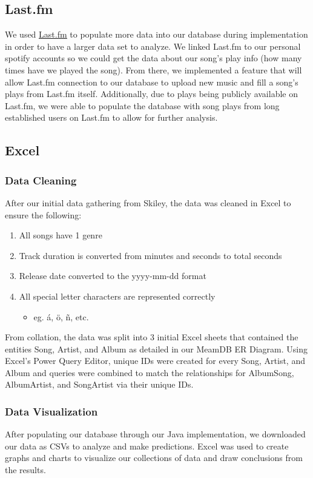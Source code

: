 \documentclass[12pt]{article}
\begin{document}
    \subsection{Last.fm}
    We used \underline{\href{https://www.last.fm/}{Last.fm}} to populate more data into our database during implementation
    in order to have a larger data set to analyze. We linked Last.fm to our
    personal spotify accounts so we could get the data about our song's play info
    (how many times have we played the song). From there, we implemented a feature
    that will allow Last.fm connection to our database to upload new music and fill
    a song's plays from Last.fm itself. Additionally, due to plays being publicly
    available on Last.fm, we were able to populate the database with song plays from
    long established users on Last.fm to allow for further analysis.

    \subsection{Excel}
    \subsubsection{Data Cleaning}
    After our initial data gathering from Skiley, the data was cleaned in Excel to ensure
    the following:
    \begin{enumerate}
        \item All songs have 1 genre
        \item Track duration is converted from minutes and seconds to total seconds
        \item Release date converted to the yyyy-mm-dd format
        \item All special letter characters are represented correctly
            \begin{itemize}
                \item eg. \'{a}, \"{o}, \~{n}, etc.
            \end{itemize}
    \end{enumerate}
    From collation, the data was split into 3 initial Excel sheets that contained the entities Song,
    Artist, and Album as detailed in our MeamDB ER Diagram. Using Excel's Power Query Editor, unique
    IDs were created for every Song, Artist, and Album and queries were combined to match the relationships
    for AlbumSong, AlbumArtist, and SongArtist via their unique IDs.

    \subsubsection{Data Visualization}
    After populating our database through our Java implementation, we downloaded our data as CSVs to
    analyze and make predictions. Excel was used to create graphs and charts to visualize our
    collections of data and draw conclusions from the results.
\end{document}
